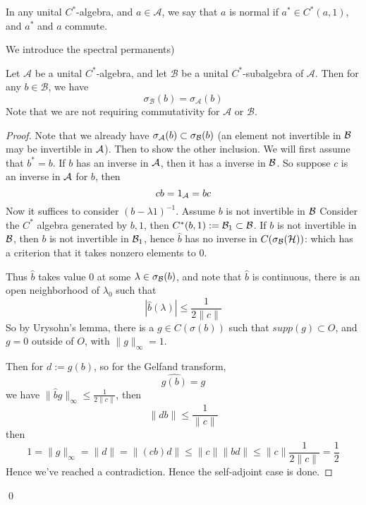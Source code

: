 \begin{definition}
    In any unital $C^*$-algebra, and $a\in\mathcal{A}$, we say that $a$ is normal if $a^*\in C^*(a, 1)$, and $a^*$ and $a$ commute.
\end{definition}
We introduce the spectral permanents)
\begin{theorem}
    Let $\mathcal{A}$ be a unital $C^*$-algebra, and let $\mathcal{B}$ be a unital $C^*$-subalgebra of $\mathcal{A}$. Then for any $b\in\mathcal{B}$, we have
    \begin{equation*}
        \sigma_\mathcal{B}(b)=\sigma_\mathcal{A}(b)
    \end{equation*}
    Note that we are not requiring commutativity for $\mathcal{A}$ or $\mathcal{B}$.
\end{theorem}
\begin{proof}
    Note that we already have $\sigma_{\mathcal{A}}(b)\subset\sigma_{\mathcal{B}}(b)$ (an element not invertible in $\mathcal{B}$ may be invertible in $\mathcal{A}$). Then to show the other inclusion.
    We will first assume that $b^*=b$. If $b$ has an inverse in $\mathcal{A}$, then it has a inverse in $\mathcal{B}$. So suppose $c$ is an inverse in $\mathcal{A}$ for $b$, then 
    \begin{equation*}
        cb=1_{\mathcal{A}}=bc
    \end{equation*}
    Now it suffices to consider $(b-\lambda 1)^{-1}$. Assume $b$ is not invertible in $\mathcal{B}$
    Consider the $C^*$ algebra generated by $b, 1$, then $C^*(b, 1):=\mathcal{B}_1\subset\mathcal{B}$. If $b$ is not invertible in $\mathcal{B}$, then $b$ is not invertible in $\mathcal{B}_1$, hence $\widehat{b}$ has no inverse in $C(\sigma_{\mathcal{B}}(\mathcal{H}))$: which has a criterion that it takes nonzero elements to 0.

    Thus $\widehat{b}$ takes value 0 at some $\lambda\in\sigma_{\mathcal{B}}(b)$, and note that $\widehat{b}$ is continuous, there is an open neighborhood of $\lambda_0$ such that
    \begin{equation*}
        |\widehat{b}(\lambda)|\leq\frac{1}{2\|c\|}
    \end{equation*}
    So by Urysohn's lemma, there is a $g\in C(\sigma(b))$ such that $supp(g)\subset O$, and $g=0$ outside of $O$, with $\|g\|_\infty=1$. 

    Then for $d:=g(b)$, so for the Gelfand transform,
    \begin{equation*}
        \widehat{g(b)}=g
    \end{equation*}
    we have $\|\widehat{b}g\|_\infty\leq\frac{1}{2\|c\|}$, then
    \begin{equation*}
        \|db\|\leq\frac{1}{\|c\|}
    \end{equation*}
    then
    \begin{equation*}
        1=\|g\|_\infty=\|d\|=\|(cb)d\|\leq\|c\|\|bd\|\leq\|c\|\frac{1}{2\|c\|}=\frac{1}{2}
    \end{equation*}
    Hence we've reached a contradiction. Hence the self-adjoint case is done. 
\end{proof}
\qed


